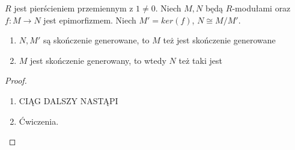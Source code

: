\begin{theorem}
  $R$ jest pierścieniem przemiennym z $1\neq 0$. Niech $M,N$ będą $R$-modułami oraz $f:M\to N$ jest epimorfizmem. Niech $M'=ker(f)$, $N\cong M/M'$.

  \begin{enumerate}
    \item $N,M'$ są skończenie generowane, to $M$ też jest skończenie generowane
    \item $M$ jest skończenie generowany, to wtedy $N$ też taki jest
  \end{enumerate}
\end{theorem}
\begin{proof}
  \begin{enumerate}
    \item CIĄG DALSZY NASTĄPI
    \item Ćwiczenia.
  \end{enumerate}
\end{proof}
